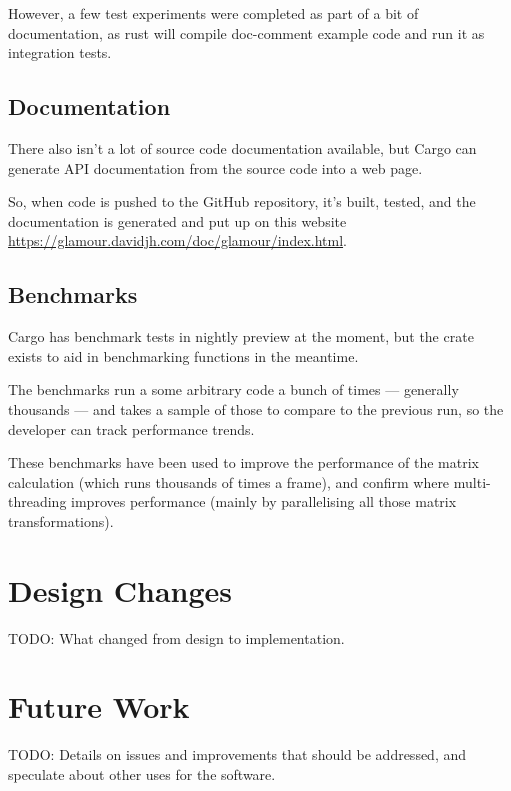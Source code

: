 \begin{multicols}{2}
  However, a few test experiments were completed as part of a bit of documentation, as rust will compile doc-comment example code and run it as integration tests.

  \subsection{Documentation}
  There also isn't a lot of source code documentation available, but Cargo can generate API documentation from the source code into a web page.

  So, when code is pushed to the GitHub repository, it's built, tested, and the documentation is generated and put up on this website \url{https://glamour.davidjh.com/doc/glamour/index.html}.

  \subsection{Benchmarks}
  Cargo has benchmark tests in nightly preview at the moment, but the  crate exists to aid in benchmarking functions in the meantime.

  The benchmarks run a some arbitrary code a bunch of times — generally thousands — and takes a sample of those to compare to the previous run, so the developer can track performance trends.

  These benchmarks have been used to improve the performance of the  matrix calculation (which runs thousands of times a frame), and confirm where multi-threading improves performance (mainly by parallelising all those matrix transformations).

  \section{Design Changes}

  TODO: What changed from design to implementation.

  \section{Future Work}

  TODO: Details on issues and improvements that should be addressed, and speculate about other uses for the software.


\end{multicols}

